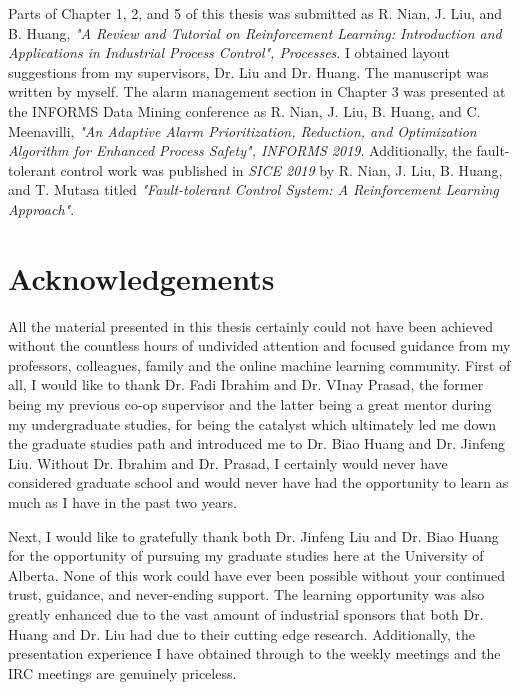 \documentclass[12pt]{report}
\begin{document}
Parts of Chapter 1, 2, and 5 of this thesis was submitted as R. Nian, J. Liu, and B. Huang, \textit{"A Review and Tutorial on Reinforcement Learning: Introduction and Applications in Industrial Process Control", Processes}.  I obtained layout suggestions from my supervisors, Dr. Liu and Dr. Huang.  The manuscript was written by myself. The alarm management section in Chapter 3 was presented at the INFORMS Data Mining conference as R. Nian, J. Liu, B. Huang, and C. Meenavilli, \textit{"An Adaptive Alarm Prioritization, Reduction, and Optimization Algorithm for Enhanced Process Safety", INFORMS 2019}.  Additionally, the fault-tolerant control work was published in \textit{SICE 2019} by R. Nian, J. Liu, B. Huang, and T. Mutasa titled \textit{"Fault-tolerant Control System: A Reinforcement Learning Approach"}.

\tableofcontents
\listoffigures
\listoftables

\chapter*{Acknowledgements}
All the material presented in this thesis certainly could not have been achieved without the countless hours of undivided attention and focused guidance from my professors, colleagues, family and the online machine learning community. First of all, I would like to thank Dr. Fadi Ibrahim and Dr. VInay Prasad, the former being my previous co-op supervisor and the latter being a great mentor during my undergraduate studies, for being the catalyst which ultimately led me down the graduate studies path and introduced me to Dr. Biao Huang and Dr. Jinfeng Liu. Without Dr. Ibrahim and Dr. Prasad, I certainly would never have considered graduate school and would never have had the opportunity to learn as much as I have in the past two years.  

Next, I would like to gratefully thank both Dr. Jinfeng Liu and Dr. Biao Huang for the opportunity of pursuing my graduate studies here at the University of Alberta.  None of this work could have ever been possible without your continued trust, guidance, and never-ending support.  The learning opportunity was also greatly enhanced due to the vast amount of industrial sponsors that both Dr. Huang and Dr. Liu had due to their cutting edge research.  Additionally, the presentation experience I have obtained through to the weekly meetings and the IRC meetings are genuinely priceless.
\end{document}
